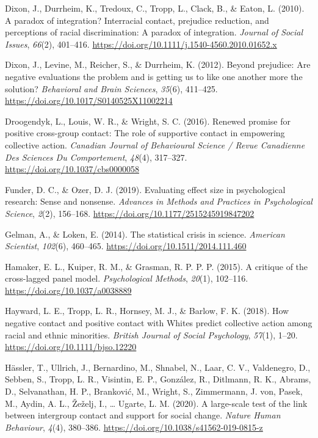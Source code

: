 \documentclass[twocolumn, 11pt, letterpaper]{article}
\begin{document}
\leavevmode\hypertarget{ref-dixon_paradox_2010}{}%
Dixon, J., Durrheim, K., Tredoux, C., Tropp, L., Clack, B., \& Eaton, L.
(2010). A paradox of integration? Interracial contact, prejudice
reduction, and perceptions of racial discrimination: A paradox of
integration. \emph{Journal of Social Issues}, \emph{66}(2), 401--416.
\url{https://doi.org/10.1111/j.1540-4560.2010.01652.x}

\leavevmode\hypertarget{ref-dixon_beyond_2012}{}%
Dixon, J., Levine, M., Reicher, S., \& Durrheim, K. (2012). Beyond
prejudice: Are negative evaluations the problem and is getting us to
like one another more the solution? \emph{Behavioral and Brain
Sciences}, \emph{35}(6), 411--425.
\url{https://doi.org/10.1017/S0140525X11002214}

\leavevmode\hypertarget{ref-droogendyk_renewed_2016}{}%
Droogendyk, L., Louis, W. R., \& Wright, S. C. (2016). Renewed promise
for positive cross-group contact: The role of supportive contact in
empowering collective action. \emph{Canadian Journal of Behavioural
Science / Revue Canadienne Des Sciences Du Comportement}, \emph{48}(4),
317--327. \url{https://doi.org/10.1037/cbs0000058}

\leavevmode\hypertarget{ref-funder_evaluating_2019}{}%
Funder, D. C., \& Ozer, D. J. (2019). Evaluating effect size in
psychological research: Sense and nonsense. \emph{Advances in Methods
and Practices in Psychological Science}, \emph{2}(2), 156--168.
\url{https://doi.org/10.1177/2515245919847202}

\leavevmode\hypertarget{ref-gelman_statistical_2014}{}%
Gelman, A., \& Loken, E. (2014). The statistical crisis in science.
\emph{American Scientist}, \emph{102}(6), 460--465.
\url{https://doi.org/10.1511/2014.111.460}

\leavevmode\hypertarget{ref-hamaker_critique_2015}{}%
Hamaker, E. L., Kuiper, R. M., \& Grasman, R. P. P. P. (2015). A
critique of the cross-lagged panel model. \emph{Psychological Methods},
\emph{20}(1), 102--116. \url{https://doi.org/10.1037/a0038889}

\leavevmode\hypertarget{ref-hayward_how_2018}{}%
Hayward, L. E., Tropp, L. R., Hornsey, M. J., \& Barlow, F. K. (2018).
How negative contact and positive contact with Whites predict collective
action among racial and ethnic minorities. \emph{British Journal of
Social Psychology}, \emph{57}(1), 1--20.
\url{https://doi.org/10.1111/bjso.12220}

\leavevmode\hypertarget{ref-hassler_large-scale_2020}{}%
Hässler, T., Ullrich, J., Bernardino, M., Shnabel, N., Laar, C. V.,
Valdenegro, D., Sebben, S., Tropp, L. R., Visintin, E. P., González, R.,
Ditlmann, R. K., Abrams, D., Selvanathan, H. P., Branković, M., Wright,
S., Zimmermann, J. von, Pasek, M., Aydin, A. L., Žeželj, I., \ldots{}
Ugarte, L. M. (2020). A large-scale test of the link between intergroup
contact and support for social change. \emph{Nature Human Behaviour},
\emph{4}(4), 380--386. \url{https://doi.org/10.1038/s41562-019-0815-z}
\end{document}
